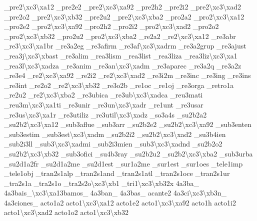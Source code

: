\begin{DoxyCompactItemize}
\-\_\-pre2\textbackslash{}xc3\textbackslash{}xa12 \-\_\-pre2e2 \-\_\-pre2\textbackslash{}xc3\textbackslash{}xa92 \-\_\-pre2h2 \-\_\-pre2i2 \-\_\-pre2\textbackslash{}xc3\textbackslash{}xad2 \-\_\-pre2o2 \-\_\-pre2\textbackslash{}xc3\textbackslash{}xb32 \-\_\-pre2u2 \-\_\-pre2\textbackslash{}xc3\textbackslash{}xba2 \-\_\-pro2a2 \-\_\-pro2\textbackslash{}xc3\textbackslash{}xa12 \-\_\-pro2e2 \-\_\-pro2\textbackslash{}xc3\textbackslash{}xa92 \-\_\-pro2h2 \-\_\-pro2i2 \-\_\-pro2\textbackslash{}xc3\textbackslash{}xad2 \-\_\-pro2o2 \-\_\-pro2\textbackslash{}xc3\textbackslash{}xb32 \-\_\-pro2u2 \-\_\-pro2\textbackslash{}xc3\textbackslash{}xba2 \-\_\-re2a2 \-\_\-re2\textbackslash{}xc3\textbackslash{}xa12 \-\_\-re3abr \-\_\-re3\textbackslash{}xc3\textbackslash{}xa1br \-\_\-re3a2eg \-\_\-re3afirm \-\_\-re3af\textbackslash{}xc3\textbackslash{}xadrm \-\_\-re3a2grup \-\_\-re3ajust \-\_\-rea3j\textbackslash{}xc3\textbackslash{}xbast \-\_\-re3alim \-\_\-rea3lism \-\_\-rea3list \-\_\-rea3liza \-\_\-rea3liz\textbackslash{}xc3\textbackslash{}xa1 \-\_\-rea3l\textbackslash{}xc3\textbackslash{}xadza \-\_\-re3anim \-\_\-re3an\textbackslash{}xc3\textbackslash{}xadm \-\_\-re3aparec \-\_\-re3a2q \-\_\-re3a2z \-\_\-re3e4 \-\_\-re2\textbackslash{}xc3\textbackslash{}xa92 \-\_\-re2i2 \-\_\-re2\textbackslash{}xc3\textbackslash{}xad2 \-\_\-re3i2m \-\_\-re3inc \-\_\-re3ing \-\_\-re3ins \-\_\-re3int \-\_\-re2o2 \-\_\-re2\textbackslash{}xc3\textbackslash{}xb32 \-\_\-re3o2b \-\_\-re1oc \-\_\-re1oj \-\_\-re3orga \-\_\-retro1a \-\_\-re2u2 \-\_\-re2\textbackslash{}xc3\textbackslash{}xba2 \-\_\-re3ubica \-\_\-re3ub\textbackslash{}xc3\textbackslash{}xadca \-\_\-reu3mati \-\_\-reu3m\textbackslash{}xc3\textbackslash{}xa1ti \-\_\-re3unir \-\_\-re3un\textbackslash{}xc3\textbackslash{}xadr \-\_\-re1unt \-\_\-re3usar \-\_\-re3us\textbackslash{}xc3\textbackslash{}xa1r \-\_\-re3utiliz \-\_\-re3util\textbackslash{}xc3\textbackslash{}xadz \-\_\-so3a4s \-\_\-su2b2a2 \-\_\-su2b2\textbackslash{}xc3\textbackslash{}xa12 \-\_\-sub3aflue \-\_\-sub3arr \-\_\-su2b2e2 \-\_\-su2b2\textbackslash{}xc3\textbackslash{}xa92 \-\_\-sub3enten \-\_\-sub3estim \-\_\-sub3est\textbackslash{}xc3\textbackslash{}xadm \-\_\-su2b2i2 \-\_\-su2b2\textbackslash{}xc3\textbackslash{}xad2 \-\_\-su3b4ien \-\_\-sub2i3ll \-\_\-sub3\textbackslash{}xc3\textbackslash{}xadmi \-\_\-sub2i3mien \-\_\-sub3\textbackslash{}xc3\textbackslash{}xadnd \-\_\-su2b2o2 \-\_\-su2b2\textbackslash{}xc3\textbackslash{}xb32 \-\_\-sub3ofici \-\_\-su4b3ray \-\_\-su2b2u2 \-\_\-su2b2\textbackslash{}xc3\textbackslash{}xba2 \-\_\-sub3urba \-\_\-su2d1a2fr \-\_\-su2d1a2me \-\_\-su2d1est \-\_\-sur1a2me \-\_\-sur1est \-\_\-sur1oes \-\_\-tele1imp \-\_\-tele1obj \-\_\-tran2s1alp \-\_\-tran2s1and \-\_\-tran2s1atl \-\_\-tran2s1oce \-\_\-tran2s1ur \-\_\-tra2s1a \-\_\-tra2s1o \-\_\-tra2s2o\textbackslash{}xc3\textbackslash{}xb1 \-\_\-tri1\textbackslash{}xc3\textbackslash{}xb32x 4a3ba\-\_\- 4a3bais\-\_\textbackslash{}xc3\textbackslash{}xa13bamos\-\_\- 4a3ban\-\_\- 4a3bas\-\_\- acante2 4a3ci\textbackslash{}xc3\textbackslash{}xb3n\-\_\- 4a3ciones\-\_\- acto1a2 acto1\textbackslash{}xc3\textbackslash{}xa12 acto1e2 acto1\textbackslash{}xc3\textbackslash{}xa92 acto1h acto1i2 acto1\textbackslash{}xc3\textbackslash{}xad2 acto1o2 acto1\textbackslash{}xc3\textbackslash{}xb32 
\end{DoxyCompactItemize}
